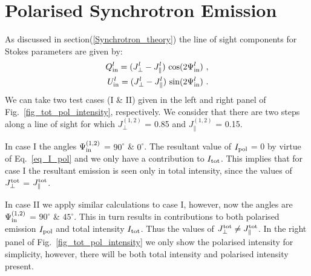 \documentclass[usenatbib]{mnras}
\begin{document}

\section{Polarised Synchrotron Emission}
\label{Appendix_A}
As discussed in section(\ref{Synchrotron_theory}) the line of sight components for Stokes parameters are given by:
\begin{eqnarray}
Q^l_{\rm in} = ({J_{\perp}^l} - J_{\parallel}^l) \ {\cos}(2\Psi^l_{\rm in}) \ ,\\ U^l_{\rm in} = ({J_{\perp}^l} - J_{\parallel}^l) \ {\sin}(2\Psi^l_{\rm in}) \ .
\end{eqnarray}
We can take two test cases (I \& II) given in the left and right panel of Fig.~\ref{fig_tot_pol_intensity}, respectively. We consider that there are two steps along a line of sight for which ${J_{\perp}^{(1,2)}}$ = 0.85 and $J_{\parallel}^{(1,2)}$  = 0.15. 

In case I the angles $\Psi_{\rm in}^{(1,2)}$ = $90^{\circ}$ \& $0^{\circ}$. The resultant value of $I_{\rm pol}$ = 0 by virtue of Eq.~\ref{eq_I_pol} and we only have a contribution to $I_{\rm tot}$. This implies that for case I the resultant emission is seen only in total intensity, since the values of $J_{\perp}^{\rm tot}$ = $J_{\parallel}^{\rm tot}$. 

In case II we apply similar calculations to case I, however, now the angles are $\Psi_{\rm in}^{(1,2)}$ = $90^{\circ}$ \& $45^{\circ}$. This in turn results in contributions to both polarised emission $I_{\rm pol}$ and total intensity $I_{\rm tot}$. Thus the values of $J_{\perp}^{\rm tot} \neq J_{\parallel}^{\rm tot}$. In the right panel of Fig.~\ref{fig_tot_pol_intensity} we only show the polarised intensity for simplicity, however, there will be both total intensity and polarised intensity present.
\end{document}
